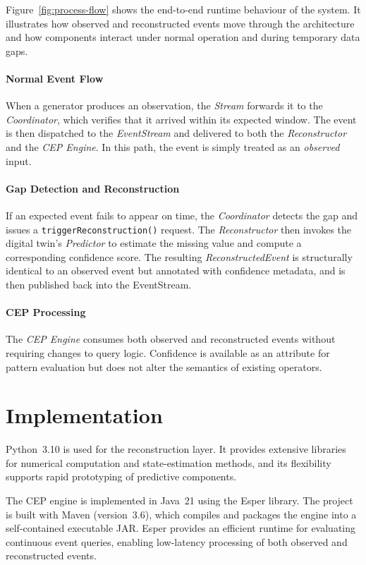 Figure~\ref{fig:process-flow} shows the end-to-end runtime behaviour of the system. It illustrates how observed and reconstructed events move through the architecture and how components interact under normal operation and during temporary data gaps.

\paragraph{Normal Event Flow}
When a generator produces an observation, the \textit{Stream} forwards it to the \textit{Coordinator}, which verifies that it arrived within its expected window. The event is then dispatched to the \textit{EventStream} and delivered to both the \textit{Reconstructor} and the \textit{CEP Engine}. In this path, the event is simply treated as an \emph{observed} input.

\paragraph{Gap Detection and Reconstruction}
If an expected event fails to appear on time, the \textit{Coordinator} detects the gap and issues a \texttt{triggerReconstruction()} request. The \textit{Reconstructor} then invokes the digital twin’s \textit{Predictor} to estimate the missing value and compute a corresponding confidence score. The resulting \textit{ReconstructedEvent} is structurally identical to an observed event but annotated with confidence metadata, and is then published back into the EventStream.

\paragraph{CEP Processing}
The \textit{CEP Engine} consumes both observed and reconstructed events without requiring changes to query logic. Confidence is available as an attribute for pattern evaluation but does not alter the semantics of existing operators.


\section{Implementation}\label{sec:implementation}
Python~3.10 is used for the reconstruction layer. It provides extensive libraries for numerical computation and state-estimation methods, and its flexibility supports rapid prototyping of predictive components.

The CEP engine is implemented in Java~21 using the Esper library. The project is built with Maven (version~3.6), which compiles and packages the engine into a self-contained executable JAR. Esper provides an efficient runtime for evaluating continuous event queries, enabling low-latency processing of both observed and reconstructed events.


